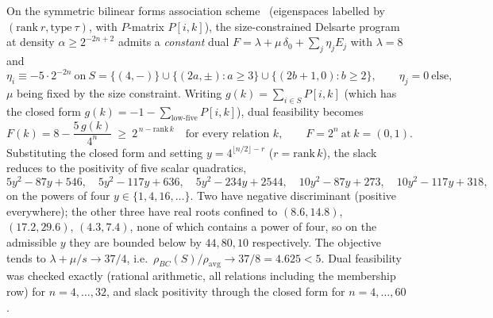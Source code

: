 \documentclass[11pt,a4paper]{article}
\theoremstyle{plain}
\theoremstyle{definition}
\begin{document}
On the symmetric bilinear forms association scheme~\cite{Schmidt2018} (eigenspaces labelled by $(\mathrm{rank}\ r,\mathrm{type}\ \tau)$, with $P$-matrix $P[i,k]$), the size-constrained Delsarte program at density $\alpha\ge 2^{-2n+2}$ admits a \emph{constant} dual $F=\lambda+\mu\,\delta_0+\sum_j\eta_j E_j$ with $\lambda=8$ and
\[
\eta_i\equiv -5\cdot 2^{-2n}\ \text{on}\ S=\{(4,-)\}\cup\{(2a,\pm):a\ge3\}\cup\{(2b{+}1,0):b\ge2\},\qquad \eta_j=0\ \text{else},
\]
$\mu$ being fixed by the size constraint. Writing $g(k)=\sum_{i\in S}P[i,k]$ (which has the closed form $g(k)=-1-\sum_{\text{low-five}}P[i,k]$), dual feasibility becomes
\[
F(k)=8-\frac{5\,g(k)}{4^{n}}\ \ge\ 2^{\,n-\mathrm{rank}\,k}\quad\text{for every relation }k,\qquad F=2^{n}\ \text{at}\ k=(0,1).
\]
Substituting the closed form and setting $y=4^{\lfloor n/2\rfloor-r}$ ($r=\mathrm{rank}\,k$), the slack reduces to the positivity of five scalar quadratics,
\[
5y^2{-}87y{+}546,\quad 5y^2{-}117y{+}636,\quad 5y^2{-}234y{+}2544,\quad 10y^2{-}87y{+}273,\quad 10y^2{-}117y{+}318,
\]
on the powers of four $y\in\{1,4,16,\dots\}$. Two have negative discriminant (positive everywhere); the other three have real roots confined to $(8.6,14.8)$, $(17.2,29.6)$, $(4.3,7.4)$, none of which contains a power of four, so on the admissible $y$ they are bounded below by $44,80,10$ respectively. The objective tends to $\lambda+\mu/s\to 37/4$, i.e.\ $\rho_{BC}(S)/\rho_{\mathrm{avg}}\to 37/8=4.625<5$. Dual feasibility was checked exactly (rational arithmetic, all relations including the membership row) for $n=4,\dots,32$, and slack positivity through the closed form for $n=4,\dots,60$.
\end{document}
